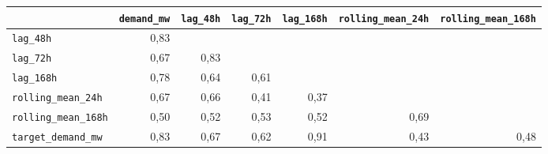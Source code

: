 \begin{tabular}{lrrrrrr}
\toprule
 & \texttt{demand\_mw} & \texttt{lag\_48h} & \texttt{lag\_72h} & \texttt{lag\_168h} & \texttt{rolling\_mean\_24h} & \texttt{rolling\_mean\_168h} \\
\midrule
\texttt{lag\_48h} & 0{,}83 &  &  &  &  &  \\
\texttt{lag\_72h} & 0{,}67 & 0{,}83 &  &  &  &  \\
\texttt{lag\_168h} & 0{,}78 & 0{,}64 & 0{,}61 &  &  &  \\
\texttt{rolling\_mean\_24h} & 0{,}67 & 0{,}66 & 0{,}41 & 0{,}37 &  &  \\
\texttt{rolling\_mean\_168h} & 0{,}50 & 0{,}52 & 0{,}53 & 0{,}52 & 0{,}69 &  \\
\texttt{target\_demand\_mw} & 0{,}83 & 0{,}67 & 0{,}62 & 0{,}91 & 0{,}43 & 0{,}48 \\
\bottomrule
\end{tabular}